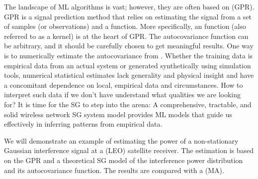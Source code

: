 \documentclass{article}
\begin{document}
        
                 The landscape of ML algorithms is vast; however, they are often based on  (GPR). GPR is a signal prediction method that relies on estimating the signal from a set of samples (or observations) and a  function. More specifically, an  function (also referred to as a kernel) is at the heart of GPR. The autocovariance function can be arbitrary, and it should be carefully chosen to get meaningful results. One way is to numerically estimate the autocovariance from . Whether the training data is empirical data from an actual system or generated synthetically using simulation tools, numerical statistical estimates lack generality and physical insight and have a concomitant dependence on local, empirical data and circumstances. How to interpret such data if we don't have understand what qualities we are looking for? It is time for the SG to step into the arena: A comprehensive, tractable, and solid wireless network SG system model provides ML models that guide us effectively in inferring patterns from empirical data.
                 

                 We will demonstrate an example of estimating the power of a non-stationary Gaussian interference signal at a  (LEO) satellite receiver. The estimation is based on the GPR and a theoretical SG model of the interference power distribution and its autocovariance function. The results are compared with a  (MA). 
                 
\end{document}
